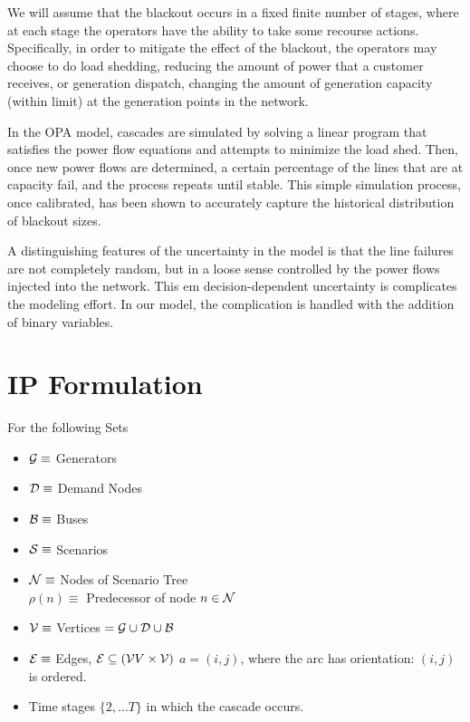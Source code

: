 We will assume that the blackout occurs in a fixed finite number of
stages, where at each stage the operators have the ability to take
some recourse actions.  Specifically, in order to mitigate the effect
of the blackout, the operators may choose to do
load shedding, reducing the amount of power that a customer
receives, or  generation dispatch, changing the amount of
generation capacity (within limit) at the generation points in the
network. 


In the OPA model, cascades are simulated by
solving a linear program that satisfies the power flow equations and
attempts to minimize the load shed.  Then, once new power flows are
determined, a certain percentage of the lines that are at capacity
fail, and the process repeats until stable.  This simple simulation
process, once calibrated, has been shown to accurately capture the
historical distribution of blackout sizes.

A distinguishing features of the uncertainty in the model is that the
line failures are not completely random, but in a loose sense controlled
by the power flows injected into the network.  This em
  decision-dependent uncertainty is complicates the modeling effort.
In our model, the complication is handled with the addition of binary
variables.




\section{IP Formulation}

For the following Sets
\begin{itemize}
\item $ \mathcal{G} \equiv $ Generators 
\item $ \mathcal{D} \equiv $ Demand Nodes 
\item $ \mathcal{B} \equiv $ Buses 
\item $ \mathcal{S} \equiv $ Scenarios 
\item $ \mathcal{N} \equiv $ Nodes of Scenario Tree\\
	$\rho \left( n \right) \equiv $ Predecessor of node $ n \in \mathcal{N} $
\item $ \mathcal{V} \equiv $ Vertices $ = \mathcal{G} \cup \mathcal{D} \cup \mathcal{B} $
\item $ \mathcal{E} \equiv $ Edges, $ \mathcal{E} \subseteq (\mathcal{V}{V} \times \mathcal{V} )$\newline
	$  a = ( i , j )  $,  where the arc has orientation: $(i,j)$ is ordered. 
\item Time stages $\{2,\ldots T\}$ in which the cascade occurs.
\end{itemize}





